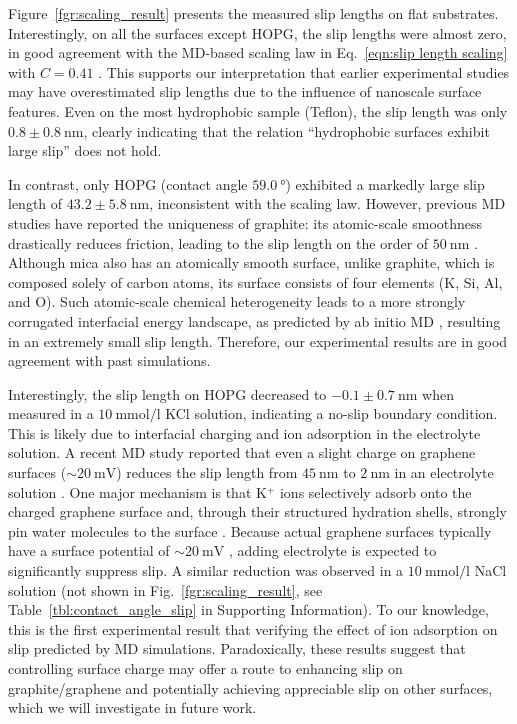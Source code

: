 \documentclass[journal=jacsat,manuscript=article]{achemso}
\begin{document}
Figure~\ref{fgr:scaling_result} presents the measured slip lengths on flat substrates. Interestingly, on all the surfaces except HOPG, the slip lengths were almost zero, in good agreement with the MD-based scaling law in Eq.~\ref{eqn:slip length scaling} with \(C = 0.41\) \cite{Huang2008-xu}. This supports our interpretation that earlier experimental studies may have overestimated slip lengths due to the influence of nanoscale surface features. Even on the most hydrophobic sample (Teflon), the slip length was only \(0.8 \pm \SI{0.8}{\nano\metre}\), clearly indicating that the relation ``hydrophobic surfaces exhibit large slip'' does not hold.

In contrast, only HOPG (contact angle \(\SI{59.0}{\degree}\)) exhibited a markedly large slip length of \(43.2 \pm \SI{5.8}{\nano\metre}\), inconsistent with the scaling law. However, previous MD studies have reported the uniqueness of graphite: its atomic-scale smoothness drastically reduces friction, leading to the slip length on the order of \(\SI{50}{\nano\metre}\) \cite{Wagemann2017-bk, Kannam2012-jx}. Although mica also has an atomically smooth surface, unlike graphite, which is composed solely of carbon atoms, its surface consists of four elements (K, Si, Al, and O). Such atomic-scale chemical heterogeneity leads to a more strongly corrugated interfacial energy landscape, as predicted by ab initio MD \cite{Tocci2014-es}, resulting in an extremely small slip length. Therefore, our experimental results are in good agreement with past simulations. 

Interestingly, the slip length on HOPG decreased to \(-0.1 \pm \SI{0.7}{\nano\metre}\) when measured in a \(\SI{10}{\milli\mole\per\litre}\) KCl solution, indicating a no-slip boundary condition. This is likely due to interfacial charging and ion adsorption in the electrolyte solution. A recent MD study reported that even a slight charge on graphene surfaces (\(\sim\SI{20}{\milli\volt}\)) reduces the slip length from \(\SI{45}{\nano\metre}\) to \(\SI{2}{\nano\metre}\) in an electrolyte solution \cite{Xie2020-as}. One major mechanism is that K\(^+\) ions selectively adsorb onto the charged graphene surface and, through their structured hydration shells, strongly pin water molecules to the surface \cite{Mu2021-wm}. Because actual graphene surfaces typically have a surface potential of \(\sim\SI{20}{\milli\volt}\) \cite{Paruchuri2004-iu}, adding electrolyte is expected to significantly suppress slip. A similar reduction was observed in a \(\SI{10}{\milli\mole\per\litre}\) NaCl solution (not shown in Fig.~\ref{fgr:scaling_result}, see Table~\ref{tbl:contact_angle_slip} in Supporting Information). To our knowledge, this is the first experimental result that verifying the effect of ion adsorption on slip predicted by MD simulations. Paradoxically, these results suggest that controlling surface charge may offer a route to enhancing slip on graphite/graphene and potentially achieving appreciable slip on other surfaces, which we will investigate in future work.
\end{document}
